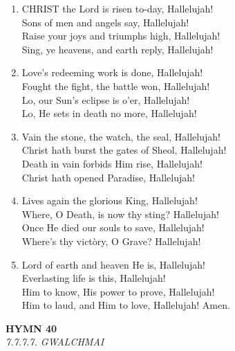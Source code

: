 \begin{enumerate}
    \item CHRIST the Lord is risen to-day, Hallelujah! \\
        Sons of men and angels say, Hallelujah! \\
        Raise your joys and triumphs high, Hallelujah! \\
        Sing, ye heavens, and earth reply, Hallelujah!

    \item Love's redeeming work is done, Hallelujah! \\
        Fought the fight, the battle won, Hallelujah! \\
        Lo, our Sun's eclipse is o'er, Hallelujah! \\
        Lo, He sets in death no more, Hallelujah!

    \item Vain the stone, the watch, the seal, Hallelujah! \\
        Christ hath burst the gates of Sheol, Hallelujah! \\
        Death in vain forbids Him rise, Hallelujah! \\
        Christ hath opened Paradise, Hallelujah!

    \item Lives again the glorious King, Hallelujah! \\
        Where, O Death, is now thy sting? Hallelujah! \\
        Once He died our souls to save, Hallelujah! \\
        Where's thy vict\`ory, O Grave? Hallelujah!

    \item Lord of earth and heaven He is, Hallelujah! \\
        Everlasting life is this, Hallelujah! \\
        Him to know, His power to prove, Hallelujah! \\
        Him to laud, and Him to love, Hallelujah! Amen.

\end{enumerate}

\newpage
\begin{center}
    {\Large \textbf{HYMN 40}}
    \\
    \textit{7.7.7.7. GWALCHMAI}
\end{center}
\vspace{1em}

